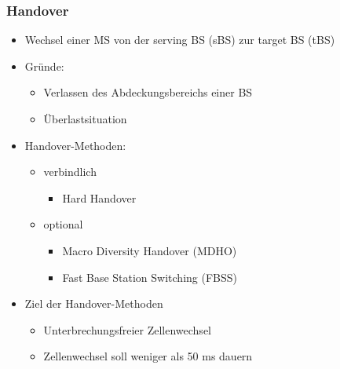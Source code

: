 \subsubsection{Handover}
\begin{itemize}
\item Wechsel einer MS von der serving BS (sBS) zur target BS (tBS)
\item Gründe:
\begin{itemize}
\item Verlassen des Abdeckungsbereichs einer BS
\item Überlastsituation
\end{itemize}
\item Handover-Methoden:
\begin{itemize}
\item verbindlich
\begin{itemize}
\item Hard Handover
\end{itemize}
\item optional
\begin{itemize}
\item Macro Diversity Handover (MDHO)
\item Fast Base Station Switching (FBSS)
\end{itemize}
\end{itemize}
\item Ziel der Handover-Methoden
\begin{itemize}
\item Unterbrechungsfreier Zellenwechsel
\item Zellenwechsel soll weniger als 50 ms dauern
\end{itemize}
\end{itemize}